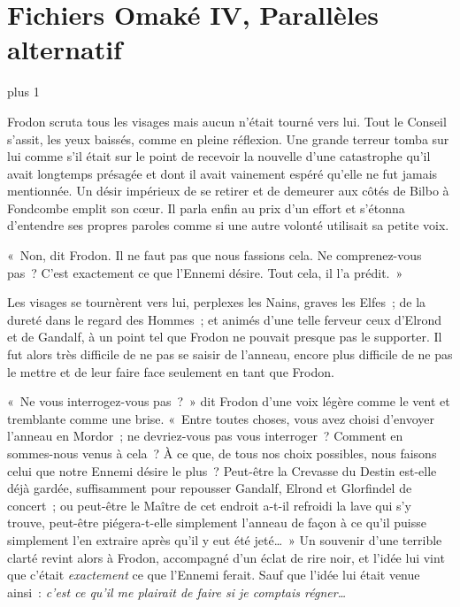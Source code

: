 
\makeatletter
\newcommand{\OmakeIVspecialsection}[2][1.5]{%
\vspace*{2\baselineskip plus 1\baselineskip minus 1\baselineskip}%
\noindent\hfill\scalebox{#1}{#2}\hfill\mbox{}%
\vskip 1\baselineskip plus 1\baselineskip%
\@afterindentfalse\@afterheading
}
\makeatother

\newcommand{\OmakeIVsection}[2][1.2]{%
  \OmakeIVspecialsection[#1]{\MakeUppercase{#2}}}

\chapter{Fichiers Omaké IV, Parallèles alternatif}

\OmakeIVspecialsection[1.6]{\fontspec[ExternalLocation]{RingBearer}
\settowidth{\versewidth}{\mbox{Le}}
Seigneur\scalebox{.40}{\parbox[b]{\versewidth}{%
        \centering de\\\nointerlineskip\vskip 4pt la}}Rationalit\raisebox{.2ex}{É}}

Frodon scruta tous les visages mais aucun n'était tourné vers lui. Tout le Conseil s'assit, les yeux baissés, comme en pleine réflexion. Une grande terreur tomba sur lui comme s'il était sur le point de recevoir la nouvelle d'une catastrophe qu'il avait longtemps présagée et dont il avait vainement espéré qu'elle ne fut jamais mentionnée. Un désir impérieux de se retirer et de demeurer aux côtés de Bilbo à Fondcombe emplit son cœur. Il parla enfin au prix d'un effort et s'étonna d'entendre ses propres paroles comme si une autre volonté utilisait sa petite voix.

«~Non, dit Frodon. Il ne faut pas que nous fassions cela. Ne comprenez-vous pas~? C'est exactement ce que l'Ennemi désire. Tout cela, il l'a prédit.~»

Les visages se tournèrent vers lui, perplexes les Nains, graves les Elfes~; de la dureté dans le regard des Hommes~; et animés d'une telle ferveur ceux d'Elrond et de Gandalf, à un point tel que Frodon ne pouvait presque pas le supporter. Il fut alors très difficile de ne pas se saisir de l'anneau, encore plus difficile de ne pas le mettre et de leur faire face seulement en tant que Frodon.

«~Ne vous interrogez-vous pas~?~» dit Frodon d'une voix légère comme le vent et tremblante comme une brise. «~Entre toutes choses, vous avez choisi d'envoyer l'anneau en Mordor~; ne devriez-vous pas vous interroger~? Comment en sommes-nous venus à cela~? À ce que, de tous nos choix possibles, nous faisons celui que notre Ennemi désire le plus~? Peut-être la Crevasse du Destin est-elle déjà gardée, suffisamment pour repousser Gandalf, Elrond et Glorfindel de concert~; ou peut-être le Maître de cet endroit a-t-il refroidi la lave qui s'y trouve, peut-être piégera-t-elle simplement l'anneau de façon à ce qu'il puisse simplement l'en extraire après qu'il y eut été jeté…~» Un souvenir d'une terrible clarté revint alors à Frodon, accompagné d'un éclat de rire noir, et l'idée lui vint que c'était \emph{exactement} ce que l'Ennemi ferait. Sauf que l'idée lui était venue ainsi~: \emph{c'est ce qu'il me plairait de faire si je comptais régner…}

